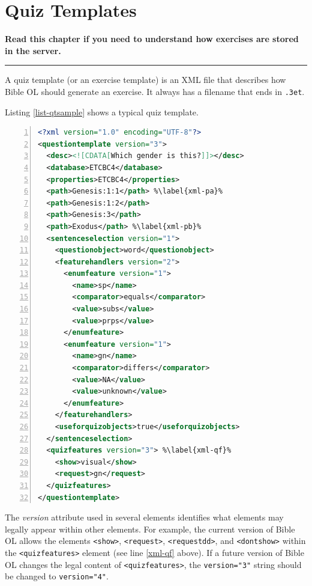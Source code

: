 \documentclass[11pt,oneside,a4paper]{memoir}
\newcommand*{\xml}[1]{\texttt{<#1>}}
\newcommand*{\xmla}[1]{\texttt{#1}} %
\begin{document}
\chapter{Quiz Templates}

\textbf{Read this chapter if you need to understand how exercises are stored in the server.}
\plainbreak{3}


A quiz template (or an exercise template) is an XML file that describes how Bible OL should
generate an exercise. It always has a filename that ends in \texttt{.3et}.

Listing \ref{list-qtsample} shows a typical quiz template.

\begin{lstlisting}[language=XML,numbers=left,caption=Quiz template sample,label=list-qtsample]
<?xml version="1.0" encoding="UTF-8"?>
<questiontemplate version="3">
  <desc><![CDATA[Which gender is this?]]></desc>
  <database>ETCBC4</database>
  <properties>ETCBC4</properties>
  <path>Genesis:1:1</path> %\label{xml-pa}%
  <path>Genesis:1:2</path>
  <path>Genesis:3</path>
  <path>Exodus</path> %\label{xml-pb}%
  <sentenceselection version="1">
    <questionobject>word</questionobject>
    <featurehandlers version="2">
      <enumfeature version="1">
        <name>sp</name>
        <comparator>equals</comparator>
        <value>subs</value>
        <value>prps</value>
      </enumfeature>
      <enumfeature version="1">
        <name>gn</name>
        <comparator>differs</comparator>
        <value>NA</value>
        <value>unknown</value>
      </enumfeature>
    </featurehandlers>
    <useforquizobjects>true</useforquizobjects>
  </sentenceselection>
  <quizfeatures version="3"> %\label{xml-qf}%
    <show>visual</show>
    <request>gn</request>
  </quizfeatures>
</questiontemplate>
\end{lstlisting}

The \emph{version} attribute used in several elements identifies what elements may legally appear
within other elements. For example, the current version of Bible OL allows the elements \xml{show},
\xml{request}, \xml{requestdd}, and \xml{dontshow} within the \xml{quizfeatures} element (see line
\ref{xml-qf} above). If a future version of Bible OL changes the legal content of
\xml{quizfeatures}, the \xmla{version="3"} string should be changed to \xmla{version="4"}.
\end{document}
